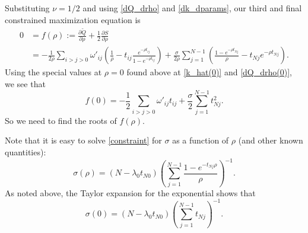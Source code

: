 \documentclass[12pt,leqno]{article}
\begin{document}
Substituting $\nu =1/2$ and using \eqref{dQ_drho} and \eqref{dk_dparams}, our third and final constrained maximization
equation is
\begin{align*}
  0 &= f(\rho) := \frac{\partial\tilde{Q}}{\partial\rho} + \frac{1}{2}\frac{\partial{S}}{\partial\rho} \\
  &= -\frac{1}{2\rho}\sum_{i>j>0}\omega'_{ij}\left(\frac{1}{\rho} - t_{ij}\frac{e^{-\rho{t_{ij}}}}{1-e^{-\rho t_{ij}}}\right)
  +\frac{\sigma}{2\rho}\sum_{j=1}^{N-1}\left(\frac{1 - e^{-\rho{t_{Nj}}}}{\rho} - t_{Nj}e^{-\rho t_{Nj}}\right).
\end{align*}
Using the special values at $\rho=0$ found above at \eqref{k_hat(0)} and \eqref{dQ_drho(0)}, we see that
$$
f(0) = -\frac{1}{2}\sum_{i>j>0}\omega'_{ij}t_{ij} + \frac{\sigma}{2}\sum_{j=1}^{N-1}t_{Nj}^2.
$$
So we need to find the roots of $f(\rho)$.


Note that it is easy to solve \eqref{constraint} for $\sigma$ as a function of $\rho$ (and other
known quantities):
\begin{equation}\label{eq4}
  \sigma(\rho) = (N - \lambda_0t_{N0})\left(\sum_{j=1}^{N-1}\frac{1-e^{-t_{Nj}\rho}}{\rho}\right)^{-1}.
\end{equation}
As noted above, the Taylor expansion for the exponential shows that
$$
\sigma(0) = (N - \lambda_0t_{N0})\left(\sum_{j=1}^{N-1}t_{Nj}\right)^{-1}.
$$



\end{document}
